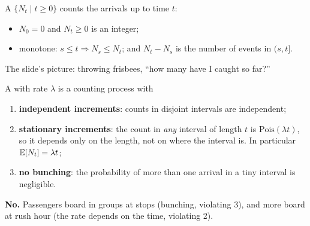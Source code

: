 \begin{center}
\end{center}

\begin{defn}
A  $\{N_t\mid t\ge0\}$ counts the arrivals up to time $t$:
\begin{itemize}
  \item $N_0=0$ and $N_t\ge0$ is an integer;
  \item monotone: $s\le t\Rightarrow N_s\le N_t$; and $N_t-N_s$ is the number of events in $(s,t]$.
\end{itemize}
The slide's picture: throwing frisbees, ``how many have I caught so far?''
\end{defn}

\begin{defn}
A  with rate $\lambda$ is a counting process with
\begin{enumerate}
  \item \textbf{independent increments}: counts in disjoint intervals are independent;
  \item \textbf{stationary increments}: the count in \emph{any} interval of length $t$ is $\text{Pois}(\lambda t)$, so it depends only on the length, not on where the interval is. In particular $\mathbb{E}[N_t]=\lambda t$;
  \item \textbf{no bunching}: the probability of more than one arrival in a tiny interval is negligible.
\end{enumerate}
\end{defn}

\begin{example}
\textbf{No.} Passengers board in groups at stops (bunching, violating 3), and more board at rush hour (the rate depends on the time, violating 2).
\end{example}

